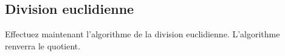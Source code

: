 \documentclass[11pt,a4paper]{article}
\begin{document}
%

\bigskip


\vfillLast

\clearpage


\subsection{Division euclidienne}

\bigskip

Effectuez maintenant l'algorithme de la division euclidienne.
L'algorithme renverra le quotient.


\vfillFirst
\end{document}
